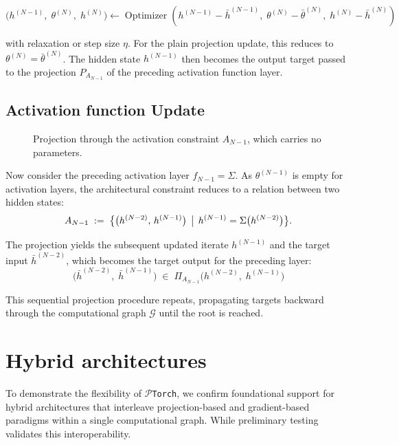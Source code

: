 \documentclass{article}
\begin{document}
\begin{equation}
\bigl(h^{(N-1)},\;\theta^{(N)},\; h^{(N)}\bigr) \gets \operatorname{Optimizer}\!\left( {h}^{(N-1)} - \bar h^{(N-1)},\; {\theta}^{(N)} - \bar \theta^{(N)},\; {h}^{(N)} - \bar h^{(N)} \right)
\end{equation}

with relaxation or step size $\eta$. For the plain projection update, this reduces to $\theta^{(N)} = \bar{\theta}^{(N)}$. The hidden state $h^{(N-1)}$ then becomes the output target passed to the projection $P_{A_{N-1}}$ of the preceding activation function layer.

\subsection{Activation function Update}
\begin{figure}[htbp]
\centering
\resizebox{0.78\textwidth}{!}{%

}
\caption{Projection through the activation constraint $A_{N-1}$, which carries no
parameters.}
\label{fig:next_back_prop_mid}
\end{figure}
 
Now consider the preceding activation layer $f_{N-1} = \Sigma$. As $\theta^{(N-1)}$ is empty for activation layers, the architectural constraint reduces to a relation between two hidden states:
\[
A_{N-1} \;:=\; \bigl\{\bigl(h^{(N-2)},\, h^{(N-1)}\bigr) \,\bigm|\,
h^{(N-1)} = \Sigma\bigl(h^{(N-2)}\bigr) \bigr\}.
\]

The projection yields the subsequent updated iterate $h^{(N-1)}$ and the target input $\bar{h}^{(N-2)}$, which becomes the target output for the preceding layer:
\begin{equation}
\bigl(\bar{h}^{(N-2)},\; \bar h^{(N-1)}\bigr) \;\in\; \Pi_{A_{N-1}}\!\bigl(h^{(N-2)},\; h^{(N-1)}\bigr)
\end{equation}

This sequential projection procedure repeats, propagating targets backward through the computational graph $\mathcal{G}$ until the root is reached.

\section{Hybrid architectures}
To demonstrate the flexibility of \texttt{$\mathcal{P}$Torch}, we confirm foundational support for hybrid architectures that interleave projection-based and gradient-based paradigms within a single computational graph. While preliminary testing validates this interoperability.
\end{document}
